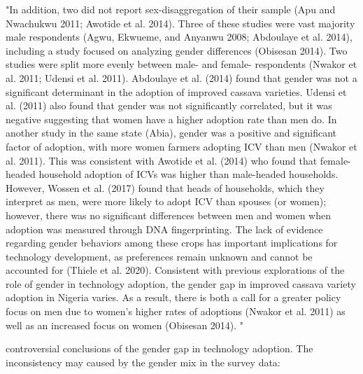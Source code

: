 \documentclass[12pt]{article}
\begin{document}
"In addition, two did not report sex-disaggregation of their sample (Apu and Nwachukwu 2011; Awotide et al. 2014). Three of these studies were vast majority male respondents (Agwu, Ekwueme, and Anyanwu 2008; Abdoulaye et al. 2014), including a study focused on analyzing gender differences (Obisesan 2014). Two studies were split more evenly between male- and female- respondents (Nwakor et al. 2011; Udensi et al. 2011). Abdoulaye et al. (2014) found that gender was not a significant determinant in the adoption of improved cassava varieties. Udensi et al. (2011) also found that gender was not significantly correlated, but it was negative suggesting that women have a higher adoption rate than men do. In another study in the same state (Abia), gender was a positive and significant factor of adoption, with more women farmers adopting ICV than men (Nwakor et al. 2011). This was consistent with Awotide et al. (2014) who found that female-headed household adoption of ICVs was higher than male-headed households. However, Wossen et al. (2017) found that heads of households, which they interpret as men, were more likely to adopt ICV than spouses (or women); however, there was no significant differences between men and women when adoption was measured through DNA fingerprinting. The lack of evidence regarding gender behaviors among these crops has important implications for technology development, as preferences remain unknown and cannot be accounted for (Thiele et al. 2020). Consistent with previous explorations of the role of gender in technology adoption, the gender gap in improved cassava variety adoption in Nigeria varies. As a result, there is both a call for a greater policy focus on men due to women’s higher rates of adoptions (Nwakor et al. 2011) as well as an increased focus on women (Obisesan 2014).  "

controversial conclusions of the gender gap in technology adoption. The inconsistency may caused by the gender mix in the survey data:
\end{document}
